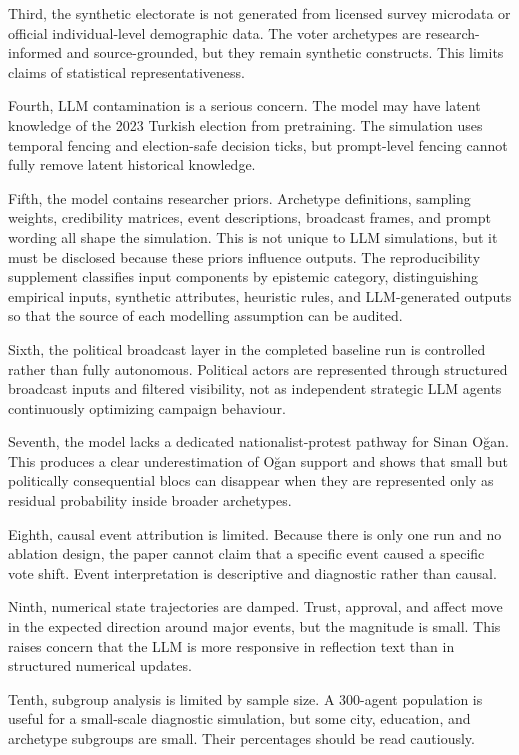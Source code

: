 \documentclass[pdflatex,sn-mathphys-num,iicol]{sn-jnl}
\begin{document}
Third, the synthetic electorate is not generated from licensed survey microdata or official individual-level demographic data. The voter archetypes are research-informed and source-grounded, but they remain synthetic constructs. This limits claims of statistical representativeness.

Fourth, LLM contamination is a serious concern. The model may have latent knowledge of the 2023 Turkish election from pretraining. The simulation uses temporal fencing and election-safe decision ticks, but prompt-level fencing cannot fully remove latent historical knowledge.

Fifth, the model contains researcher priors. Archetype definitions, sampling weights, credibility matrices, event descriptions, broadcast frames, and prompt wording all shape the simulation. This is not unique to LLM simulations, but it must be disclosed because these priors influence outputs. The reproducibility supplement classifies input components by epistemic category, distinguishing empirical inputs, synthetic attributes, heuristic rules, and LLM-generated outputs so that the source of each modelling assumption can be audited.

Sixth, the political broadcast layer in the completed baseline run is controlled rather than fully autonomous. Political actors are represented through structured broadcast inputs and filtered visibility, not as independent strategic LLM agents continuously optimizing campaign behaviour.

Seventh, the model lacks a dedicated nationalist-protest pathway for Sinan Oğan. This produces a clear underestimation of Oğan support and shows that small but politically consequential blocs can disappear when they are represented only as residual probability inside broader archetypes.

Eighth, causal event attribution is limited. Because there is only one run and no ablation design, the paper cannot claim that a specific event caused a specific vote shift. Event interpretation is descriptive and diagnostic rather than causal.

Ninth, numerical state trajectories are damped. Trust, approval, and affect move in the expected direction around major events, but the magnitude is small. This raises concern that the LLM is more responsive in reflection text than in structured numerical updates.

Tenth, subgroup analysis is limited by sample size. A 300-agent population is useful for a small-scale diagnostic simulation, but some city, education, and archetype subgroups are small. Their percentages should be read cautiously.
\end{document}
